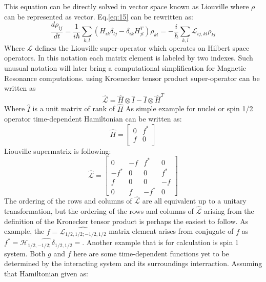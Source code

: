 This equation can be directly solved in vector space known as Liouville where $\rho$ can be represented as vector. Eq.\ref{eq:15} can be rewritten as:
 \begin{equation}\label{eq:16}
\frac{d\rho_{ij}}{dt}=\frac{1}{i\hbar}\sum_{k,l}(H_{ik}\delta_{lj}-\delta_{ik}H_{jl}^T)\rho_{kl}=-\frac{i}{\hbar}\sum_{k,l}\mathcal{L}_{ij,kl}\rho_{kl}
\end{equation} 
Where $\mathcal{L}$ defines the Liouville super-operator which operates on Hilbert space operators. In this notation each matrix element is labeled by two indexes. Such unusual notation will later bring a computational simplification for Magnetic Resonance computations. 
using Kroenecker tensor product super-operator can be written as 
\begin{equation}\label{eq:17}
\hat{\mathcal{L}}=\hat{H}\otimes\hat{I}-\hat{I}\otimes\hat{H}^{T}
\end{equation} 
Where $\hat{I}$ is a unit matrix of rank of $\hat{H}$
As simple example for nuclei or spin 1/2 operator time-dependent Hamiltonian can be written as: 
\begin{equation}\label{eq:18}
\hat{H} = \begin{bmatrix}
       0 & f^*           \\[0.3em]
       f & 0 \\[0.3em]
     \end{bmatrix}
\end{equation}
Liouville supermatrix is following: 
\begin{equation}\label{eq:19}
\hat{\mathcal{L}} = \begin{bmatrix}
       0 & -f & f^* & 0          \\[0.3em]
       -f^* & 0 & 0 & f^* \\[0.3em]
       f & 0 & 0 & -f \\[0.3em]
       0 & f & -f^* & 0 
     \end{bmatrix}
\end{equation}
The ordering of the rows and columns of $\hat{\mathcal{L}}$ are all equivalent up to a unitary transformation, but the ordering of the rows and columns of $\hat{\mathcal{L}}$ arising from the definition of the Kronecker tensor product is perhaps the easiest to follow. As example, the $f=\hat{\mathcal{L}_{1/2,1/2;-1/2,1/2}}$ matrix element arises from conjugate of $f$ as $f^*=\hat{\mathcal{H}_{1/2,-1/2;}\delta_{1/2,1/2}}=$. Another example that is  for calculation is spin 1 system. Both $g$ and $f$ here are some time-dependent functions yet to be determined by the interacting system and its surroundings interraction. Assuming that Hamiltonian given as: 
